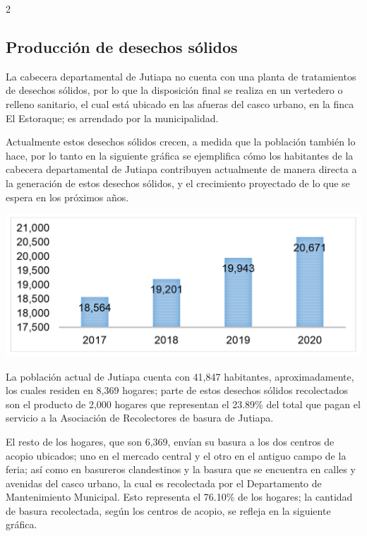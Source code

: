 \documentclass[11pt,spanish,Letterpaper,openany]{book}
\begin{document}
\begin {multicols}{2}
\hypertarget{produccion-de-desechos-solidos}{%
\subsection{Producción de desechos sólidos}\label{produccion-de-desechos-solidos}}

La cabecera departamental de Jutiapa no cuenta con una planta de tratamientos de desechos sólidos, por lo que la disposición final se realiza en un vertedero o relleno sanitario, el cual está ubicado en las afueras del casco urbano, en la finca El Estoraque; es arrendado por la municipalidad.

Actualmente estos desechos sólidos crecen, a medida que la población también lo hace, por lo tanto en la siguiente gráfica se ejemplifica cómo los habitantes de la cabecera departamental de Jutiapa contribuyen actualmente de manera directa a la generación de estos desechos sólidos, y el crecimiento proyectado de lo que se espera en los próximos años.

\begin {flushleft}
\noindent\begin{minipage}[c]{\columnwidth}

\includegraphics[width=1\linewidth]{images/201901-gfong-imagen01}

\end{minipage}

\end {flushleft}

La población actual de Jutiapa cuenta con 41,847 habitantes, aproximadamente, los cuales residen en 8,369 hogares; parte de estos desechos sólidos recolectados son el producto de 2,000 hogares que representan el 23.89\% del total que pagan el servicio a la Asociación de Recolectores de basura de Jutiapa.

El resto de los hogares, que son 6,369, envían su basura a los dos centros de acopio ubicados; uno en el mercado central y el otro en el antiguo campo de la feria; así como en basureros clandestinos y la basura que se encuentra en calles y avenidas del casco urbano, la cual es recolectada por el Departamento de Mantenimiento Municipal. Esto representa el 76.10\% de los hogares; la cantidad de basura recolectada, según los centros de acopio, se refleja en la siguiente gráfica.


\end{multicols}
\end{document}
